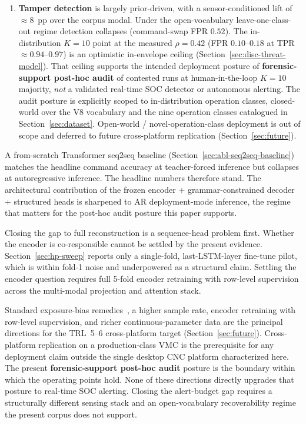 \documentclass[sensors,article,submit,moreauthors,pdftex]{Definitions/mdpi}
\begin{document}
\begin{enumerate}[label=(\arabic*), leftmargin=*, nosep]
\item \textbf{Tamper detection} is largely prior-driven, with a sensor-conditioned lift of $\approx\!8$~pp over the corpus modal. Under the open-vocabulary leave-one-class-out regime detection collapses (command-swap FPR $0.52$). The in-distribution $K\!=\!10$ point at the measured $\rho\!=\!0.42$ (FPR $0.10$--$0.18$ at TPR $\approx\!0.94$--$0.97$) is an optimistic in-envelope ceiling (Section~\ref{sec:disc-threat-model}). That ceiling supports the intended deployment posture of \textbf{forensic-support post-hoc audit} of contested runs at human-in-the-loop $K\!=\!10$ majority, \emph{not} a validated real-time SOC detector or autonomous alerting. The audit posture is explicitly scoped to in-distribution operation classes, closed-world over the V8 vocabulary and the nine operation classes catalogued in Section~\ref{sec:dataset}. Open-world / novel-operation-class deployment is out of scope and deferred to future cross-platform replication (Section~\ref{sec:future}).
\end{enumerate}

A from-scratch Transformer seq2seq baseline (Section~\ref{sec:abl-seq2seq-baseline}) matches the headline command accuracy at teacher-forced inference but collapses at autoregressive inference. The headline numbers therefore stand. The architectural contribution of the frozen encoder + grammar-constrained decoder + structured heads is sharpened to AR deployment-mode inference, the regime that matters for the post-hoc audit posture this paper supports.

Closing the gap to full reconstruction is a sequence-head problem first. Whether the encoder is co-responsible cannot be settled by the present evidence. Section~\ref{sec:hp-sweep} reports only a single-fold, last-LSTM-layer fine-tune pilot, which is within fold-1 noise and underpowered as a structural claim. Settling the encoder question requires full 5-fold encoder retraining with row-level supervision across the multi-modal projection and attention stack.

Standard exposure-bias remedies~\cite{he2019exposure,ott2018uncertainty,ranzato2016sequence,holtzman2020curious,welleck2020neural}, a higher sample rate, encoder retraining with row-level supervision, and richer continuous-parameter data are the principal directions for the TRL~5--6 cross-platform target (Section~\ref{sec:future}). Cross-platform replication on a production-class VMC is the prerequisite for any deployment claim outside the single desktop CNC platform characterized here. The present \textbf{forensic-support post-hoc audit} posture is the boundary within which the operating points hold. None of these directions directly upgrades that posture to real-time SOC alerting. Closing the alert-budget gap requires a structurally different sensing stack and an open-vocabulary recoverability regime the present corpus does not support.
\end{document}
